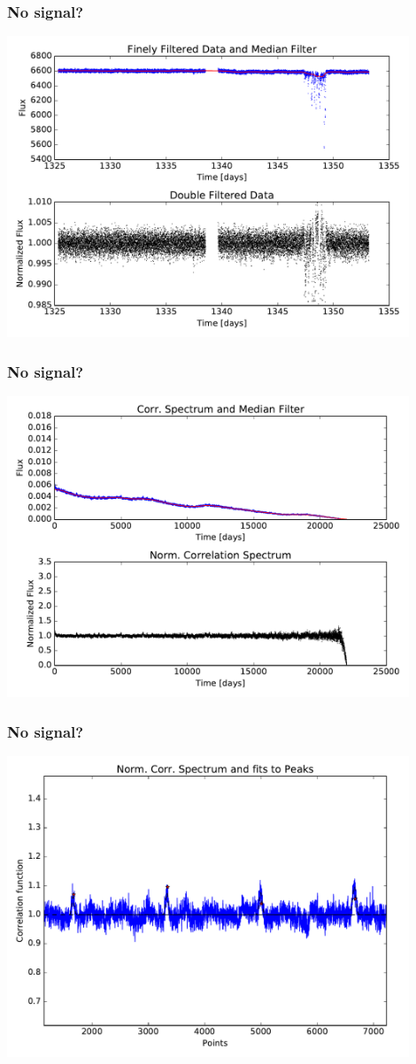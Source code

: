 \documentclass[notes]{beamer}
\begin{document}
\begin{frame}
\frametitle{No signal?}
\centering
\includegraphics[width=0.9\textwidth]{../figures/2019-1-15_16:2:14_normcurve_lightcurve_TIC89020549.pdf}
\end{frame}

\begin{frame}
\frametitle{No signal?}
\centering
\includegraphics[width=0.9\textwidth]{../figures/2019-1-15_16:2:14_normcurve_correlation_TIC89020549.pdf}
\end{frame}

\begin{frame}
\frametitle{No signal?}
\centering
\includegraphics[width=0.9\textwidth]{../figures/Corr-spektrum_zoom.pdf}
\end{frame}
\end{document}
